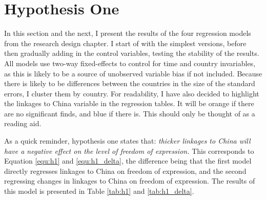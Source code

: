 \section{Hypothesis One} \label{sec:h1}
In this section and the next, I present the results of the four regression models from the research design chapter. I start of with the simplest versions, before then gradually adding in the control variables, testing the stability of the results. All models use two-way fixed-effects to control for time and country invariables, as this is likely to be a source of unobserved variable bias if not included. Because there is likely to be differences between the countries in the size of the standard errors, I cluster them by country. For readability, I have also decided to highlight the linkages to China variable in the regression tables. It will be orange if there are no significant finds, and blue if there is. This should only be thought of as a reading aid. 

As a quick reminder, hypothesis one states that: \textit{thicker linkages to China will have a negative effect on the level of freedom of expression.} This corresponds to Equation \ref{equ:h1} and \ref{equ:h1_delta}, the difference being that the first model directly regresses linkages to China on freedom of expression, and the second regressing changes in linkages to China on freedom of expression. The results of this model is presented in Table \ref{tab:h1} and \ref{tab:h1_delta}. 

